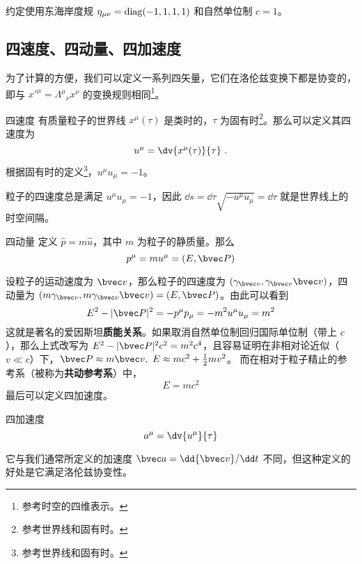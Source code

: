 

约定使用东海岸度规 $\eta_{\mu\nu}=\rm{diag}(-1,1,1,1)$ 和自然单位制 $c=1$。

\subsection{四速度、四动量、四加速度}
为了计算的方便，我们可以定义一系列四矢量，它们在洛伦兹变换下都是协变的，即与 $x'^\mu=\Lambda^\mu{}_\nu x^\nu$ 的变换规则相同\footnote{参考时空的四维表示。}。

\begin{definition}{四速度}
有质量粒子的世界线 $x^\mu(\tau)$ 是类时的，$\tau$ 为固有时\footnote{参考世界线和固有时。}。那么可以定义其四速度为
\begin{equation}
u^\mu = \dv{x^\mu(\tau)}{\tau}~.
\end{equation}
根据固有时的定义\footnote{参考世界线和固有时。}，$u^\mu u_\mu = -1$。
\end{definition}
粒子的四速度总是满足 $u^\mu u_\mu = -1$，因此 $\dd s = \dd \tau \sqrt{- u^\mu u_\mu} = \dd \tau$ 就是世界线上的时空间隔。

\begin{definition}{四动量}
定义 $\hat p=m\hat u$，其中 $m$ 为粒子的静质量。那么
\begin{equation}
p^\mu = m u^\mu = (E,\bvec P)
\end{equation}
\end{definition}
设粒子的运动速度为 $\bvec v$，那么粒子的四速度为 $(\gamma_{\bvec v},\gamma_{\bvec v}\bvec v)$，四动量为 $(m\gamma_{\bvec v}, m\gamma_{\bvec v} \bvec v)=(E,\bvec P)$。由此可以看到
\begin{equation}
E^2-|\bvec P|^2=-p^\mu p_\mu=-m^2 u^\mu u_\mu = m^2
\end{equation}
这就是著名的爱因斯坦\textbf{质能关系}。如果取消自然单位制回归国际单位制（带上 $c$），那么上式改写为 $E^2-|\bvec P|^2c^2=m^2c^4$，且容易证明在非相对论近似（$v\ll c$）下，$\bvec P\approx m\bvec v,\ E\approx mc^2+\frac{1}{2}mv^2$。
而在相对于粒子精止的参考系（被称为\textbf{共动参考系}）中，
\begin{equation}
E=mc^2
\end{equation}
最后可以定义四加速度。
\begin{definition}{四加速度}
\begin{equation}
a^\mu = \dv{u^\mu}{\tau}
\end{equation}
\end{definition}
它与我们通常所定义的加速度 $\bvec a=\dd {\bvec v}/\dd t$ 不同，但这种定义的好处是它满足洛伦兹协变性。